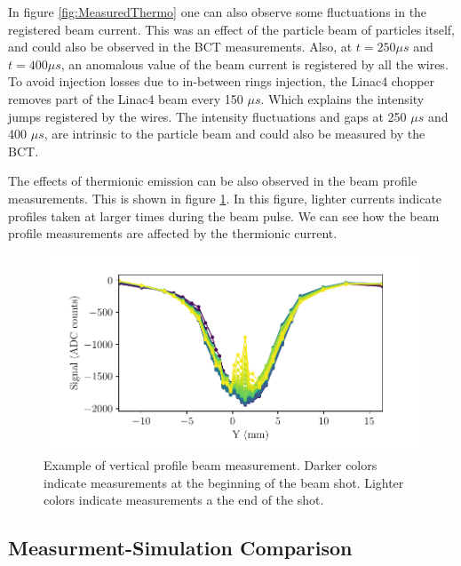 In figure \ref{fig:MeasuredThermo} one can also observe some fluctuations in the registered beam current. This was an effect of the particle beam of particles itself, and could also be observed in the BCT measurements. Also, at $t = 250 \mu s$ and $t = 400 \mu s$, an anomalous value of the beam current is registered by all the wires. To avoid injection losses due to in-between rings injection, the Linac4 chopper removes part of the Linac4 beam every 150 $\mu s$. Which explains the intensity jumps registered by the wires. The intensity fluctuations and gaps at 250 $\mu s$ and 400 $\mu s$, are intrinsic to the particle beam and could also be measured by the BCT. 

The effects of thermionic emission can be also observed in the beam profile measurements. This is shown in figure \ref{fig:JthInProf}. In this figure, lighter currents indicate profiles taken at larger times during the beam pulse. We can see how the beam profile measurements are affected by the thermionic current.

\begin{figure}[h]
    \centering
    \includegraphics[width=1.0\columnwidth]{Figure_ThermionicMeasurements/ProfileJth.pdf}
    \caption{Example of vertical profile beam measurement. Darker colors indicate measurements at the beginning of the beam shot. Lighter colors indicate measurements a the end of the shot. }
    \label{fig:JthInProf}
\end{figure}

\subsection{Measurment-Simulation Comparison}


